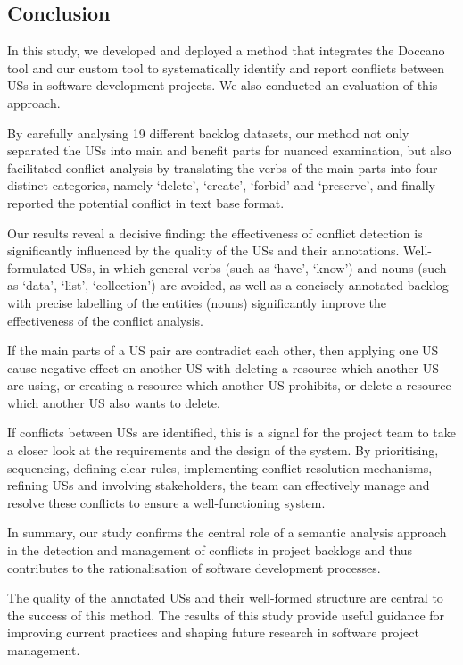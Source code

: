\subsection{Conclusion}\label{conflict_conclustion}
In this study, we developed and deployed a method that integrates the Doccano tool and our custom tool to systematically identify and report conflicts between USs in software development projects. We also conducted an evaluation of this approach.

By carefully analysing 19 different backlog datasets, our method not only separated the USs into main and benefit parts for nuanced examination, but also facilitated conflict analysis by translating the verbs of the main parts into four distinct categories, namely ‘delete’, ‘create’, ‘forbid’ and ‘preserve’, and finally reported the potential conflict in text base format.

Our results reveal a decisive finding: the effectiveness of conflict detection is significantly influenced by the quality of the USs and their annotations. Well-formulated USs, in which general verbs (such as ‘have’, ‘know’) and nouns (such as ‘data’, ‘list’, ‘collection’) are avoided, as well as a concisely annotated backlog with precise labelling of the entities (nouns) significantly improve the effectiveness of the conflict analysis.

 If the main parts of a US pair are contradict each other, then applying one US cause negative effect on another US with deleting a resource which another US are using, or creating a resource which another US prohibits, or delete a resource which another US also wants to delete. 
 
 If conflicts between USs are identified, this is a signal for the project team to take a closer look at the requirements and the design of the system. By prioritising, sequencing, defining clear rules, implementing conflict resolution mechanisms, refining USs and involving stakeholders, the team can effectively manage and resolve these conflicts to ensure a well-functioning system.
 
In summary, our study confirms the central role of a semantic analysis approach in the detection and management of conflicts in project backlogs and thus contributes to the rationalisation of software development processes.

The quality of the annotated USs and their well-formed structure are central to the success of this method. The results of this study provide useful guidance for improving current practices and shaping future research in software project management.
